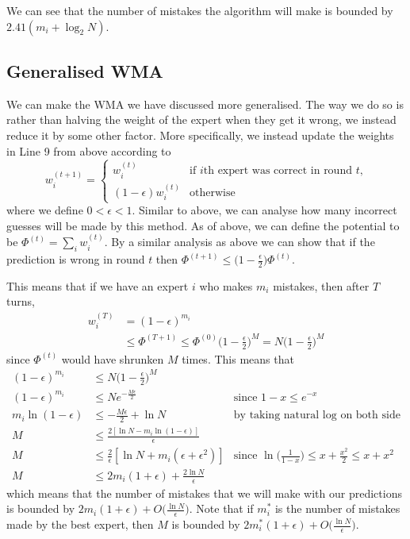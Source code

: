 \documentclass[12pt]{article}
\begin{document}
We can see that the number of mistakes the algorithm will make is bounded by $ 2.41 (m_i +  \log_2N)$.

\subsection{Generalised WMA}

We can make the WMA we have discussed more generalised. The way we do so is rather than halving the weight of the expert when they get it wrong, we instead reduce it by some other factor. More specifically, we instead update the weights in Line 9 from above according to
$$w_i^{(t+1)} = \begin{cases}
w_i^{(t)} &\text{if $i$th expert was correct in round $t$,} \\
(1-\epsilon) w_i^{(t)} &\text{otherwise}
\end{cases}$$
where we define $0 < \epsilon < 1$. Similar to above, we can analyse how many incorrect guesses will be made by this method. As of above, we can define the potential to be $\Phi^{(t)} = \sum_i w_i^{(t)}$. By a similar analysis as above we can show that if the prediction is wrong in round $t$ then $\Phi^{(t+1)} \leq \big(1 - \frac{\epsilon}{2}\big)\Phi^{(t)}$. 

This means that if we have an expert $i$ who makes $m_i$ mistakes, then after $T$ turns,
\begin{align*}
	w_i^{(T)} &= (1-\epsilon)^{m_i}\\
	 &\leq \Phi^{(T+1)} \leq \Phi^{(0)}\big(1 - \frac{\epsilon}{2}\big)^M =  N\big(1 - \frac{\epsilon}{2}\big)^M
\end{align*}
since $\Phi^{(t)}$ would have shrunken $M$ times. This means that
\begin{align*}
	(1-\epsilon)^{m_i} &\leq N\big(1 - \frac{\epsilon}{2}\big)^M \\
	(1-\epsilon)^{m_i} &\leq Ne^{-\frac{M\epsilon}{2}} &\text{since $1-x \leq e^{-x}$} \\
	m_i \ln(1-\epsilon) &\leq -\frac{M\epsilon}{2} + \ln N &\text{by taking natural log on both side} \\
	M &\leq \frac{2[\ln N - m_i \ln(1-\epsilon)]}{\epsilon}\\
	M &\leq \frac{2}{\epsilon}[\ln N + m_i (\epsilon + \epsilon^2)] &\text{since $\ln\bigg(\frac{1}{1-x}\bigg)\leq x + \frac{x^2}{2} \leq x + x^2$}\\
	M &\leq 2m_i(1+\epsilon) + \frac{2\ln N}{\epsilon}
\end{align*}
which means that the number of mistakes that we will make with our predictions is bounded by $2m_i(1+\epsilon) + O\big(\frac{\ln N}{\epsilon}\big)$. Note that if $m_i^*$ is the number of mistakes made by the best expert, then $M$ is bounded by $2m_i^*(1+\epsilon) + O\big(\frac{\ln N}{\epsilon}\big)$. 
\end{document}
